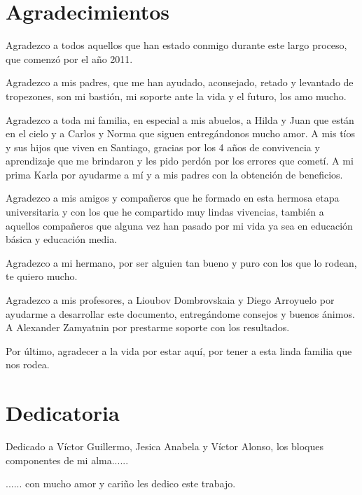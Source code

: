 \chapter*{Agradecimientos}

Agradezco a todos aquellos que han estado conmigo durante este largo proceso, que comenzó por el año 2011.

Agradezco a mis padres, que me han ayudado, aconsejado, retado y levantado de tropezones, son mi bastión, mi soporte ante la vida y el futuro, los amo mucho.

Agradezco a toda mi familia, en especial a mis abuelos, a Hilda y Juan que están en el cielo y a Carlos y Norma que siguen entregándonos mucho amor. A mis tíos y sus hijos que viven en Santiago, gracias por los 4 años de convivencia y aprendizaje que me brindaron y les pido perdón por los errores que cometí. A mi prima Karla por ayudarme a mí y a mis padres con la obtención de beneficios.

Agradezco a mis amigos y compañeros que he formado en esta hermosa etapa universitaria y con los que he compartido muy lindas vivencias, también a aquellos compañeros que alguna vez han pasado por mi vida ya sea en educación básica y educación media.

Agradezco a mi hermano, por ser alguien tan bueno y puro con los que lo rodean, te quiero mucho.

Agradezco a mis profesores, a Lioubov Dombrovskaia y Diego Arroyuelo por ayudarme a desarrollar este documento, entregándome consejos y buenos ánimos. A Alexander Zamyatnin por prestarme soporte con los resultados.

Por último, agradecer a la vida por estar aquí, por tener a esta linda familia que nos rodea.

\newpage

\chapter*{Dedicatoria}

Dedicado a Víctor Guillermo, Jesica Anabela y Víctor Alonso, los bloques componentes de mi alma......

...... con mucho amor y cariño les dedico este trabajo.